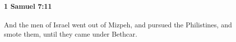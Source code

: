 
		\paragraph{1 Samuel 7:11} %
			\label{1SAMUEL-7-11}

			And the men of Israel went out of Mizpeh, and pursued the Philistines, and smote them, until they came under Bethcar.


